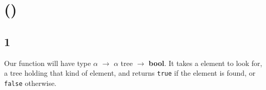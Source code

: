 \documentclass[]{book}
\newcommand{\pletrec}{\textbf{let rec}\xspace}
\newcommand{\pmatch}{\textbf{match}\xspace}
\newcommand{\pwith}{\textbf{with}\xspace}
\newcommand{\pand}{\textbf{and}\xspace}
\newcommand{\smspace}{\vspace{4mm}}
\begin{document}

\section*{ ()}

\subsection*{1}
Our function will have type \textsf{$\alpha$ $\rightarrow$ $\alpha$ tree $\rightarrow$ \textbf{bool}}. It takes a element to look for, a tree holding that kind of element, and returns \texttt{true} if the element is found, or \texttt{false} otherwise.
\end{document}
